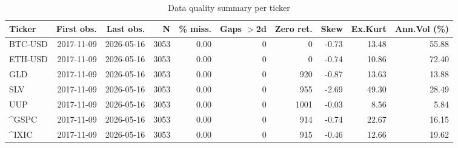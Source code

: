 \begin{table}[H]
\centering
\small
\caption{Data quality summary per ticker}
\label{tab:data_quality}
\begin{tabular}{lrrrrrrrrr}
\toprule
Ticker & First obs. & Last obs. & N & \% miss. & Gaps $>$2d & Zero ret. & Skew & Ex.Kurt & Ann.Vol (\%) \\
\midrule
BTC-USD & 2017-11-09 & 2026-05-16 & 3053 & 0.00 & 0 & 0 & -0.73 & 13.48 & 55.88 \\
ETH-USD & 2017-11-09 & 2026-05-16 & 3053 & 0.00 & 0 & 0 & -0.74 & 10.86 & 72.40 \\
GLD & 2017-11-09 & 2026-05-16 & 3053 & 0.00 & 0 & 920 & -0.87 & 13.63 & 13.88 \\
SLV & 2017-11-09 & 2026-05-16 & 3053 & 0.00 & 0 & 955 & -2.69 & 49.30 & 28.49 \\
UUP & 2017-11-09 & 2026-05-16 & 3053 & 0.00 & 0 & 1001 & -0.03 & 8.56 & 5.84 \\
\^{}GSPC & 2017-11-09 & 2026-05-16 & 3053 & 0.00 & 0 & 914 & -0.74 & 22.67 & 16.15 \\
\^{}IXIC & 2017-11-09 & 2026-05-16 & 3053 & 0.00 & 0 & 915 & -0.46 & 12.66 & 19.62 \\
\bottomrule
\end{tabular}
\end{table}